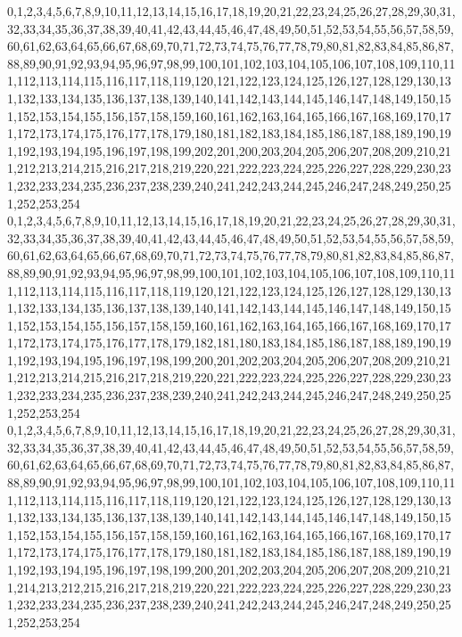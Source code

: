 \documentclass[12pt]{article}
\begin{document}
{0,1,2,3,4,5,6,7,8,9,10,11,12,13,14,15,16,17,18,19,20,21,22,23,24,25,26,27,28,29,30,31,32,33,34,35,36,37,38,39,40,41,42,43,44,45,46,47,48,49,50,51,52,53,54,55,56,57,58,59,60,61,62,63,64,65,66,67,68,69,70,71,72,73,74,75,76,77,78,79,80,81,82,83,84,85,86,87,88,89,90,91,92,93,94,95,96,97,98,99,100,101,102,103,104,105,106,107,108,109,110,111,112,113,114,115,116,117,118,119,120,121,122,123,124,125,126,127,128,129,130,131,132,133,134,135,136,137,138,139,140,141,142,143,144,145,146,147,148,149,150,151,152,153,154,155,156,157,158,159,160,161,162,163,164,165,166,167,168,169,170,171,172,173,174,175,176,177,178,179,180,181,182,183,184,185,186,187,188,189,190,191,192,193,194,195,196,197,198,199,202,201,200,203,204,205,206,207,208,209,210,211,212,213,214,215,216,217,218,219,220,221,222,223,224,225,226,227,228,229,230,231,232,233,234,235,236,237,238,239,240,241,242,243,244,245,246,247,248,249,250,251,252,253,254\\
0,1,2,3,4,5,6,7,8,9,10,11,12,13,14,15,16,17,18,19,20,21,22,23,24,25,26,27,28,29,30,31,32,33,34,35,36,37,38,39,40,41,42,43,44,45,46,47,48,49,50,51,52,53,54,55,56,57,58,59,60,61,62,63,64,65,66,67,68,69,70,71,72,73,74,75,76,77,78,79,80,81,82,83,84,85,86,87,88,89,90,91,92,93,94,95,96,97,98,99,100,101,102,103,104,105,106,107,108,109,110,111,112,113,114,115,116,117,118,119,120,121,122,123,124,125,126,127,128,129,130,131,132,133,134,135,136,137,138,139,140,141,142,143,144,145,146,147,148,149,150,151,152,153,154,155,156,157,158,159,160,161,162,163,164,165,166,167,168,169,170,171,172,173,174,175,176,177,178,179,182,181,180,183,184,185,186,187,188,189,190,191,192,193,194,195,196,197,198,199,200,201,202,203,204,205,206,207,208,209,210,211,212,213,214,215,216,217,218,219,220,221,222,223,224,225,226,227,228,229,230,231,232,233,234,235,236,237,238,239,240,241,242,243,244,245,246,247,248,249,250,251,252,253,254\\
0,1,2,3,4,5,6,7,8,9,10,11,12,13,14,15,16,17,18,19,20,21,22,23,24,25,26,27,28,29,30,31,32,33,34,35,36,37,38,39,40,41,42,43,44,45,46,47,48,49,50,51,52,53,54,55,56,57,58,59,60,61,62,63,64,65,66,67,68,69,70,71,72,73,74,75,76,77,78,79,80,81,82,83,84,85,86,87,88,89,90,91,92,93,94,95,96,97,98,99,100,101,102,103,104,105,106,107,108,109,110,111,112,113,114,115,116,117,118,119,120,121,122,123,124,125,126,127,128,129,130,131,132,133,134,135,136,137,138,139,140,141,142,143,144,145,146,147,148,149,150,151,152,153,154,155,156,157,158,159,160,161,162,163,164,165,166,167,168,169,170,171,172,173,174,175,176,177,178,179,180,181,182,183,184,185,186,187,188,189,190,191,192,193,194,195,196,197,198,199,200,201,202,203,204,205,206,207,208,209,210,211,214,213,212,215,216,217,218,219,220,221,222,223,224,225,226,227,228,229,230,231,232,233,234,235,236,237,238,239,240,241,242,243,244,245,246,247,248,249,250,251,252,253,254\\
}
\end{document}
